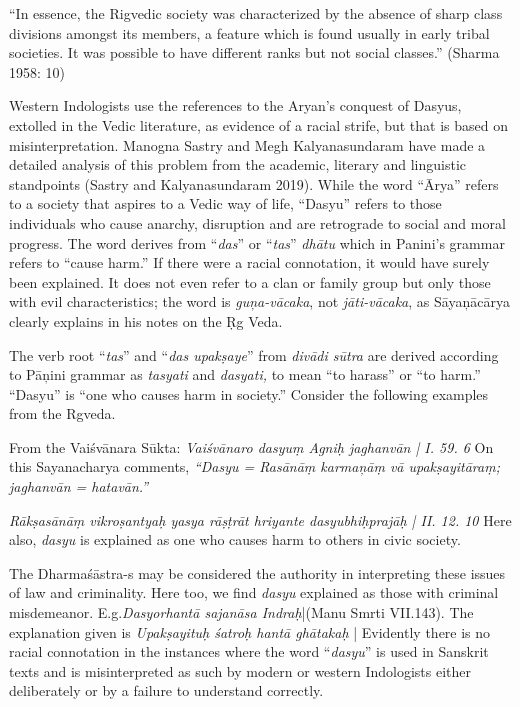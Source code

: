 \begin{myquote}
“In essence, the Rigvedic society was characterized by the absence of sharp class divisions amongst its members, a feature which is found usually in early tribal societies. It was possible to have different ranks but not social classes.” (Sharma 1958: 10)
\end{myquote}

Western Indologists use the references to the Aryan’s conquest of Dasyus, extolled in the Vedic literature, as evidence of a racial strife, but that is based on misinterpretation. Manogna Sastry and Megh Kalyanasundaram have made a detailed analysis of this problem from the academic, literary and linguistic standpoints (Sastry and Kalyanasundaram 2019). While the word “Ārya” refers to a society that aspires to a Vedic way of life, “Dasyu” refers to those individuals who cause anarchy, disruption and are retrograde to social and moral progress. The word derives from “\textit{das}” or “\textit{tas}” \textit{dhātu} which in Panini’s grammar refers to “cause harm.” If there were a racial connotation, it would have surely been explained. It does not even refer to a clan or family group but only those with evil characteristics; the word is \textit{guņa-vācaka}, not \textit{jāti-vācaka}, as Sāyaņācārya clearly explains in his notes on the Ṛg Veda.

The verb root “\textit{tas}” and “\textit{das upakṣaye}” from \textit{divādi sūtra} are derived according to Pāņini grammar as \textit{tasyati} and \textit{dasyati,} to mean “to harass” or “to harm.” “Dasyu” is “one who causes harm in society.” Consider the following examples from the Rgveda.

From the Vaiśvānara Sūkta: \textit{Vaiśvānaro dasyuṃ Agniḥ jaghanvān | I. 59. 6} On this Sayanacharya comments, \textit{“Dasyu = Rasānāṃ karmaņāṃ vā upakṣayitāraṃ; jaghanvān = hatavān.”}

\textit{Rākṣasānāṃ vikroṣantyaḥ yasya rāṣṭrāt hriyante dasyubhiḥprajāḥ | II. 12. 10} Here also, \textit{dasyu} is explained as one who causes harm to others in civic society.

The Dharmaśāstra-s may be considered the authority in interpreting these issues of law and criminality. Here too, we find \textit{dasyu} explained as those with criminal misdemeanor. E.g.\textit{Dasyorhantā sajanāsa Indraḥ}|(Manu Smrti VII.143). The explanation given is \textit{Upakṣayituḥ śatroḥ hantā ghātakaḥ} | Evidently there is no racial connotation in the instances where the word “\textit{dasyu}” is used in Sanskrit texts and is misinterpreted as such by modern or western Indologists either deliberately or by a failure to understand correctly.

